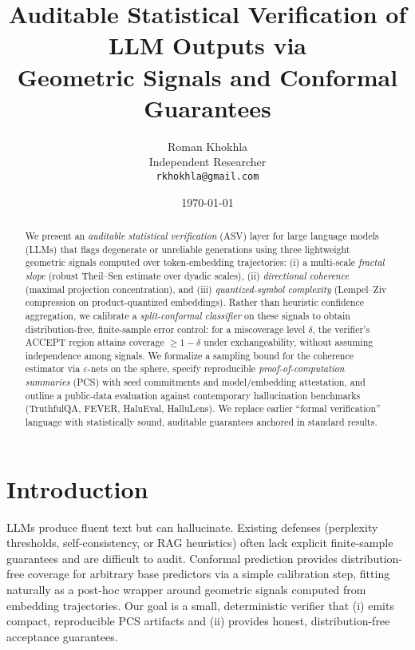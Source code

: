 \documentclass[11pt]{article}
\title{Auditable Statistical Verification of LLM Outputs via\\ Geometric Signals and Conformal Guarantees}
\author{Roman Khokhla\\ \small Independent Researcher\\ \small \texttt{rkhokhla@gmail.com}}
\date{\today}
\begin{document}
\maketitle

\begin{abstract}
We present an \emph{auditable statistical verification} (ASV) layer for large language models (LLMs) that flags degenerate or unreliable generations using three lightweight geometric signals computed over token-embedding trajectories: (i) a multi-scale \emph{fractal slope} (robust Theil--Sen estimate over dyadic scales), (ii) \emph{directional coherence} (maximal projection concentration), and (iii) \emph{quantized-symbol complexity} (Lempel--Ziv compression on product-quantized embeddings). Rather than heuristic confidence aggregation, we calibrate a \emph{split-conformal classifier} on these signals to obtain distribution-free, finite-sample error control: for a miscoverage level $\delta$, the verifier's \textsc{ACCEPT} region attains coverage $\ge 1-\delta$ under exchangeability, without assuming independence among signals. We formalize a sampling bound for the coherence estimator via $\varepsilon$-nets on the sphere, specify reproducible \emph{proof-of-computation summaries} (PCS) with seed commitments and model/embedding attestation, and outline a public-data evaluation against contemporary hallucination benchmarks (TruthfulQA, FEVER, HaluEval, HalluLens). We replace earlier ``formal verification'' language with statistically sound, auditable guarantees anchored in standard results.
\end{abstract}

\section{Introduction}
LLMs produce fluent text but can hallucinate. Existing defenses (perplexity thresholds, self-consistency, or RAG heuristics) often lack explicit finite-sample guarantees and are difficult to audit. Conformal prediction provides distribution-free coverage for arbitrary base predictors via a simple calibration step, fitting naturally as a post-hoc wrapper around geometric signals computed from embedding trajectories. Our goal is a small, deterministic verifier that (i) emits compact, reproducible PCS artifacts and (ii) provides honest, distribution-free acceptance guarantees.
\end{document}
